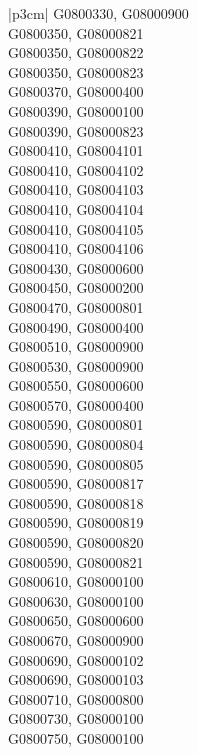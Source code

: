 \begin{customLongTable}{ |p{3cm}| }
G0800330, G08000900 \\ \hline
G0800350, G08000821 \\ \hline
G0800350, G08000822 \\ \hline
G0800350, G08000823 \\ \hline
G0800370, G08000400 \\ \hline
G0800390, G08000100 \\ \hline
G0800390, G08000823 \\ \hline
G0800410, G08004101 \\ \hline
G0800410, G08004102 \\ \hline
G0800410, G08004103 \\ \hline
G0800410, G08004104 \\ \hline
G0800410, G08004105 \\ \hline
G0800410, G08004106 \\ \hline
G0800430, G08000600 \\ \hline
G0800450, G08000200 \\ \hline
G0800470, G08000801 \\ \hline
G0800490, G08000400 \\ \hline
G0800510, G08000900 \\ \hline
G0800530, G08000900 \\ \hline
G0800550, G08000600 \\ \hline
G0800570, G08000400 \\ \hline
G0800590, G08000801 \\ \hline
G0800590, G08000804 \\ \hline
G0800590, G08000805 \\ \hline
G0800590, G08000817 \\ \hline
G0800590, G08000818 \\ \hline
G0800590, G08000819 \\ \hline
G0800590, G08000820 \\ \hline
G0800590, G08000821 \\ \hline
G0800610, G08000100 \\ \hline
G0800630, G08000100 \\ \hline
G0800650, G08000600 \\ \hline
G0800670, G08000900 \\ \hline
G0800690, G08000102 \\ \hline
G0800690, G08000103 \\ \hline
G0800710, G08000800 \\ \hline
G0800730, G08000100 \\ \hline
G0800750, G08000100 \\ \hline

\end{customLongTable}

